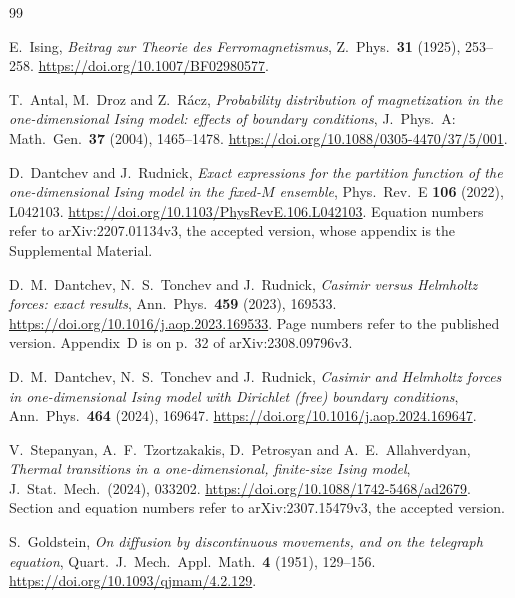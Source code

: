 \documentclass[11pt]{article}
\theoremstyle{definition}
\theoremstyle{remark}
\begin{document}
\appendix
\setcounter{equation}{0}%
\renewcommand{\theHequation}{A.\arabic{equation}}


\begin{thebibliography}{99}\small\setlength{\baselineskip}{11pt}\setlength{\itemsep}{0pt}\setlength{\parsep}{0pt}

E.~Ising, \emph{Beitrag zur Theorie des Ferromagnetismus}, Z.~Phys.\
\textbf{31} (1925), 253--258.
\url{https://doi.org/10.1007/BF02980577}.

T.~Antal, M.~Droz and Z.~R\'acz, \emph{Probability distribution of magnetization in the
one-dimensional Ising model: effects of boundary conditions},
J.~Phys.~A: Math.~Gen.~\textbf{37} (2004), 1465--1478.
\url{https://doi.org/10.1088/0305-4470/37/5/001}.

D.~Dantchev and J.~Rudnick, \emph{Exact expressions for the partition function of the
one-dimensional Ising model in the fixed-$M$ ensemble},
Phys.~Rev.~E \textbf{106} (2022), L042103.
\url{https://doi.org/10.1103/PhysRevE.106.L042103}. Equation numbers refer to
arXiv:2207.01134v3, the accepted version, whose appendix is the Supplemental Material.

D.~M.~Dantchev, N.~S.~Tonchev and J.~Rudnick, \emph{Casimir versus Helmholtz
forces: exact results}, Ann.~Phys.\ \textbf{459} (2023), 169533.
\url{https://doi.org/10.1016/j.aop.2023.169533}. Page numbers refer to the
published version. Appendix~D is on p.~32 of arXiv:2308.09796v3.

D.~M.~Dantchev, N.~S.~Tonchev and J.~Rudnick, \emph{Casimir and Helmholtz
forces in one-dimensional Ising model with Dirichlet (free) boundary
conditions}, Ann.~Phys.\ \textbf{464} (2024), 169647.
\url{https://doi.org/10.1016/j.aop.2024.169647}.

V.~Stepanyan, A.~F.~Tzortzakakis, D.~Petrosyan and A.~E.~Allahverdyan,
\emph{Thermal transitions in a one-dimensional, finite-size Ising model},
J.~Stat.~Mech.\ (2024), 033202.
\url{https://doi.org/10.1088/1742-5468/ad2679}. Section and equation numbers
refer to arXiv:2307.15479v3, the accepted version.

S.~Goldstein, \emph{On diffusion by discontinuous movements, and on the telegraph equation},
Quart.\ J.\ Mech.\ Appl.\ Math.\ \textbf{4} (1951), 129--156.
\url{https://doi.org/10.1093/qjmam/4.2.129}.


\end{thebibliography}
\end{document}
